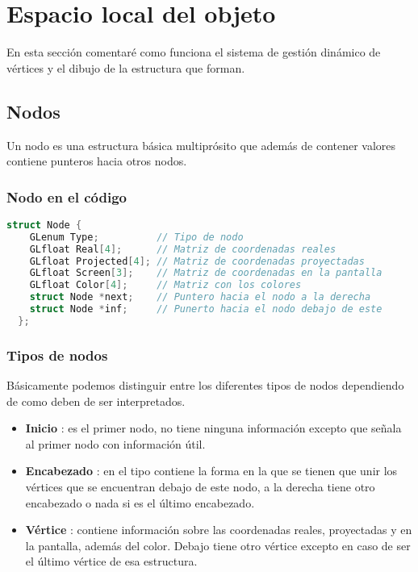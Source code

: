 \chapter{Espacio local del objeto}
En esta sección comentaré como funciona el sistema de gestión dinámico de vértices y el dibujo de la estructura que forman.
\section{Nodos}
Un nodo es una estructura básica multiprósito que además de contener valores contiene punteros hacia otros nodos.
\subsection{Nodo en el código}
\begin{lstlisting}[language=C]
  struct Node {
    GLenum Type;          // Tipo de nodo
    GLfloat Real[4];      // Matriz de coordenadas reales
    GLfloat Projected[4]; // Matriz de coordenadas proyectadas
    GLfloat Screen[3];    // Matriz de coordenadas en la pantalla
    GLfloat Color[4];     // Matriz con los colores
    struct Node *next;    // Puntero hacia el nodo a la derecha  
    struct Node *inf;     // Punerto hacia el nodo debajo de este
  };
\end{lstlisting}
\subsection{Tipos de nodos}
Básicamente podemos distinguir entre los diferentes tipos de nodos dependiendo de como deben de ser interpretados.
\begin{itemize}
\item{\textbf{Inicio} : es el primer nodo, no tiene ninguna información excepto que señala al primer nodo con información útil.}
\item{\textbf{Encabezado} : en el tipo contiene la forma en la que se tienen que unir los vértices que se encuentran debajo de este nodo, a la derecha tiene otro encabezado o nada si es el último encabezado.}
  \item{\textbf{Vértice} : contiene información sobre las coordenadas reales, proyectadas y en la pantalla, además del color. Debajo tiene otro vértice excepto en caso de ser el último vértice de esa estructura.}
\end{itemize}
